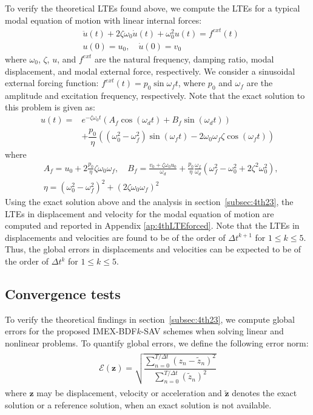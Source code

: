 \documentclass[review]{elsarticle}
\begin{document}
To verify the theoretical LTEs found above, we compute the LTEs for a typical modal equation of motion with linear internal forces:
\begin{align}
    & \ddot{u}(t) + 2\zeta \omega_0 \dot{u}(t) + \omega_0^2 u(t) = f^{ext}(t) \label{eqn:4thSDOFEqn} \\
    & u(0) = u_0, \quad \dot{u}(0) = v_0
\end{align}
where $\omega_0$, $\zeta$, $u$, and $f^{ext}$ are the natural frequency, damping ratio, modal displacement, and modal external force, respectively.
We consider a sinusoidal external forcing function: $f^{ext}(t)=p_0 \sin{\omega_f t}$, where $p_0$ and $\omega_f$ are the amplitude and excitation frequency, respectively.
Note that the exact solution to this problem is given as: 
\begin{equation}
    \begin{array}{ll}
         u(t)=&e^{-\zeta \omega_0 t} (A_f \cos(\omega_d t) + B_f \sin(\omega_d t))  \\
         &+ \dfrac{p_0}{\eta} \left( (\omega_0^2-\omega_f^2) \sin(\omega_f t) - 2 \omega_0 \omega_f \zeta \cos(\omega_f t)\right)
    \end{array}
\end{equation}
where
\begin{align}
    &A_f = u_0 + 2 \frac{p_0}{\eta} \zeta \omega_0 \omega_f, \quad
    B_f = \frac{v_0+\zeta \omega_0 u_0}{\omega_d} + \frac{p_0}{\eta}\frac{\omega_f}{\omega_d}(\omega_f^2-\omega_0^2+2 \zeta^2 \omega_0^2), \\
    &\eta = (\omega_0^2-\omega_f^2)^2+(2 \zeta \omega_0 \omega_f)^2
\end{align}
Using the exact solution above and the analysis in section~\ref{subsec:4th23}, the LTEs in displacement and velocity for the modal equation of motion are computed and reported in Appendix {\ref{ap:4thLTEforced}}.
Note that the LTEs in displacements and velocities are found to be of the order of $\Delta t^{k+1}$ for $1 \le k \le 5$.
Thus, the global errors in displacements and velocities can be expected to be of the order of $\Delta t^{k}$ for $1 \le k \le 5$.

\subsection{Convergence tests}
\label{subsec:4th24}

To verify the theoretical findings in section~\ref{subsec:4th23}, we compute global errors for the proposed IMEX-BDF$k$-SAV schemes when solving linear and nonlinear problems.
To quantify global errors, we define the following error norm:
\begin{align}
    \begin{array}{c}
        \mathcal{E}(\boldsymbol{z}) = \sqrt{ \dfrac{\sum_{n=0}^{T/\Delta t}{\left( z_n-\tilde{z}_n\right)^2}} {\sum_{n=0}^{T/\Delta t}{\left( \tilde{z}_n \right)^2}}  }
    \end{array}
    \label{eqn:4thErrorNorm}
\end{align}
where $\boldsymbol{z}$ may be displacement, velocity or acceleration and $\tilde{\boldsymbol{z}}$ denotes the exact solution or a reference solution, when an exact solution is not available.
\end{document}
